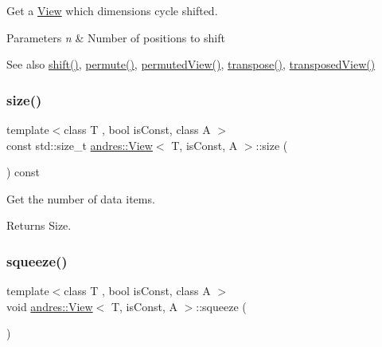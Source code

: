 Get a \hyperlink{classandres_1_1View}{View} which dimensions cycle shifted.


\begin{DoxyParams}{Parameters}
{\em n} & Number of positions to shift \\
\hline
\end{DoxyParams}
\begin{DoxySeeAlso}{See also}
\hyperlink{classandres_1_1View_a476957393b3b21333bc665e852da47ad}{shift()}, \hyperlink{classandres_1_1View_a375d3e199e219568d8a6205e4088289b}{permute()}, \hyperlink{classandres_1_1View_ad5ff9254de815d85b6c6748bad3fcd89}{permuted\+View()}, \hyperlink{classandres_1_1View_ad7acad354a5be4086b9b21ab88b18d82}{transpose()}, \hyperlink{classandres_1_1View_a98a4c17bd2faa51788f6fd533a429e73}{transposed\+View()} 
\end{DoxySeeAlso}
\mbox{\label{classandres_1_1View_aac6f255defbd6e6c5c2f16ea62dbb0e2}} 
\subsubsection{\texorpdfstring{size()}{size()}}
{\footnotesize\ttfamily template$<$class T , bool is\+Const, class A $>$ \\
const std\+::size\+\_\+t \hyperlink{classandres_1_1View}{andres\+::\+View}$<$ T, is\+Const, A $>$\+::size (\begin{DoxyParamCaption}{ }\end{DoxyParamCaption}) const\hspace{0.3cm}{\ttfamily [inline]}}

Get the number of data items.

\begin{DoxyReturn}{Returns}
Size. 
\end{DoxyReturn}
\mbox{\label{classandres_1_1View_a922763728fb80d24c32a5e5964537bdb}} 
\subsubsection{\texorpdfstring{squeeze()}{squeeze()}}
{\footnotesize\ttfamily template$<$class T , bool is\+Const, class A $>$ \\
void \hyperlink{classandres_1_1View}{andres\+::\+View}$<$ T, is\+Const, A $>$\+::squeeze (\begin{DoxyParamCaption}{ }\end{DoxyParamCaption})}

